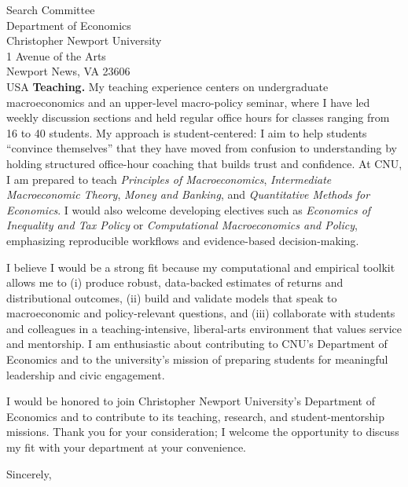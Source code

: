 \documentclass[11pt,letterpaper]{letter}
\begin{document}
\begin{letter}{Search Committee \\
Department of Economics \\
Christopher Newport University \\
1 Avenue of the Arts \\
Newport News, VA 23606 \\ USA}
\textbf{Teaching.} My teaching experience centers on undergraduate macroeconomics and an upper-level macro-policy seminar, where I have led weekly discussion sections and held regular office hours for classes ranging from 16 to 40 students. My approach is student-centered: I aim to help students “convince themselves” that they have moved from confusion to understanding by holding structured office-hour coaching that builds trust and confidence. At CNU, I am prepared to teach \textit{Principles of Macroeconomics}, \textit{Intermediate Macroeconomic Theory}, \textit{Money and Banking}, and \textit{Quantitative Methods for Economics}. I would also welcome developing electives such as \textit{Economics of Inequality and Tax Policy} or \textit{Computational Macroeconomics and Policy}, emphasizing reproducible workflows and evidence-based decision-making.

I believe I would be a strong fit because my computational and empirical toolkit allows me to (i) produce robust, data-backed estimates of returns and distributional outcomes, (ii) build and validate models that speak to macroeconomic and policy-relevant questions, and (iii) collaborate with students and colleagues in a teaching-intensive, liberal-arts environment that values service and mentorship. I am enthusiastic about contributing to CNU’s Department of Economics and to the university’s mission of preparing students for meaningful leadership and civic engagement.

I would be honored to join Christopher Newport University’s Department of Economics and to contribute to its teaching, research, and student-mentorship missions. Thank you for your consideration; I welcome the opportunity to discuss my fit with your department at your convenience.

\closing{Sincerely,}

\end{letter}
\end{document}
